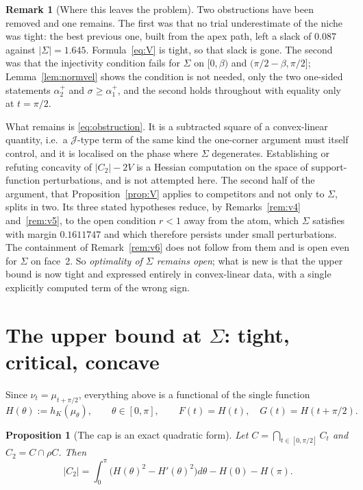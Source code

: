 \documentclass[11pt]{article}
\newtheorem{proposition}[theorem]{Proposition}
\theoremstyle{definition}
\newtheorem{remark}[theorem]{Remark}
\newcommand{\Sig}{\Sigma}
\begin{document}
\begin{remark}[Where this leaves the problem]\label{rem:leaves}
Two obstructions have been removed and one remains. The first was that no trial
underestimate of the niche was tight: the best previous one, built from the apex
path, left a slack of $0.087$ against $|\Sig|=1.645$. Formula~\eqref{eq:V} is
tight, so that slack is gone. The second was that the injectivity condition fails
for $\Sig$ on $[0,\beta)$ and $(\pi/2-\beta,\pi/2]$; Lemma~\ref{lem:normvel}
shows the condition is not needed, only the two one-sided statements
$\alpha_2^+$ and $\sigma\ge\alpha_1^+$, and the second holds throughout with
equality only at $t=\pi/2$.

What remains is \eqref{eq:obstruction}. It is a subtracted square of a
convex-linear quantity, i.e.\ a $\mathcal J$-type term of the same kind the
one-corner argument must itself control, and it is localised on the phase where
$\Sig$ degenerates. Establishing or refuting concavity of
$|C_2|-2V$ is a Hessian computation on the space of support-function
perturbations, and is not attempted here. The second half of the argument, that
Proposition~\ref{prop:V} applies to competitors and not only to $\Sig$, splits
in two. Its three stated hypotheses reduce, by Remarks~\ref{rem:v4}
and~\ref{rem:v5}, to the open condition $r<1$ away from the atom, which $\Sig$
satisfies with margin $0.1611747$ and which therefore persists under small
perturbations. The containment of Remark~\ref{rem:v6} does not follow from them
and is open even for $\Sig$ on face~2. So
\emph{optimality of $\Sig$ remains open}; what is new is that the upper bound is
now tight and expressed entirely in convex-linear data, with a single explicitly
computed term of the wrong sign.
\end{remark}

\section{The upper bound at \texorpdfstring{$\Sig$}{Sigma}: tight, critical, concave}
\label{sec:concavity}

Since $\nu_t=\mu_{t+\pi/2}$, everything above is a functional of the single function
\[
  H(\theta):=h_K(\mu_\theta),\qquad \theta\in[0,\pi],\qquad
  F(t)=H(t),\quad G(t)=H(t+\pi/2).
\]

\begin{proposition}[The cap is an exact quadratic form]\label{prop:cap}
Let $C=\bigcap_{t\in[0,\pi/2]}C_t$ and $C_2=C\cap\rho C$. Then
\begin{equation}\label{eq:capquad}
  |C_2|=\int_0^\pi\bigl(H(\theta)^2-H'(\theta)^2\bigr)d\theta-H(0)-H(\pi).
\end{equation}
\end{proposition}
\end{document}
